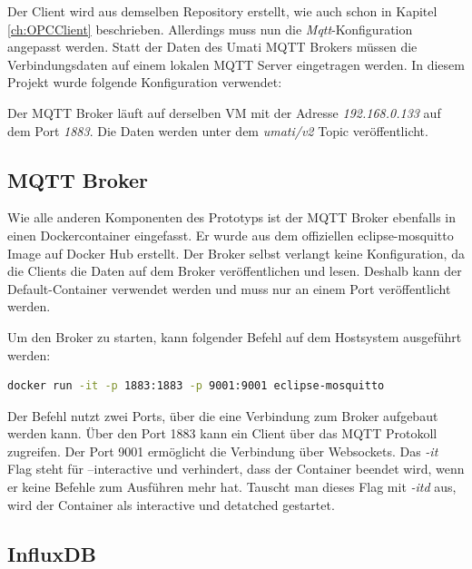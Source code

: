 \documentclass[a4paper, 12pt, oneside, toc=listofnumbered, bibliography=totoc]{scrbook}
\begin{document}
		Der Client wird aus demselben Repository erstellt, wie auch schon in Kapitel \ref{ch:OPCClient} beschrieben. Allerdings muss nun die \textit{Mqtt}-Konfiguration angepasst werden. Statt der Daten des Umati MQTT Brokers müssen die Verbindungsdaten auf einem lokalen MQTT Server eingetragen werden. In diesem Projekt wurde folgende Konfiguration verwendet:
		
		
		
		Der MQTT Broker läuft auf derselben VM mit der Adresse \textit{192.168.0.133} auf dem Port \textit{1883}. Die Daten werden unter dem \textit{umati/v2} Topic veröffentlicht. 
		
		\subsection{MQTT Broker}\label{ch:MQTT Broker}
		
		Wie alle anderen Komponenten des Prototyps ist der MQTT Broker ebenfalls in einen Dockercontainer eingefasst. Er wurde aus dem offiziellen eclipse-mosquitto Image auf Docker Hub erstellt. Der Broker selbst verlangt keine Konfiguration, da die Clients die Daten auf dem Broker veröffentlichen und lesen. Deshalb kann der Default-Container verwendet werden und muss nur an einem Port veröffentlicht werden.
		
		Um den Broker zu starten, kann folgender Befehl auf dem Hostsystem ausgeführt werden:
		
		\begin{lstlisting}[numbers=none, language=bash, frame=single]
			docker run -it -p 1883:1883 -p 9001:9001 eclipse-mosquitto
		\end{lstlisting}
	
		Der Befehl nutzt zwei Ports, über die eine Verbindung zum Broker aufgebaut werden kann. Über den Port 1883 kann ein Client über das MQTT Protokoll zugreifen. Der Port 9001 ermöglicht die Verbindung über Websockets. Das \textit{-it} Flag steht für --interactive und verhindert, dass der Container beendet wird, wenn er keine Befehle zum Ausführen mehr hat. Tauscht man dieses Flag mit \textit{-itd} aus, wird der Container als interactive und detatched gestartet.
		
		
		\subsection{InfluxDB}
		
\end{document}

